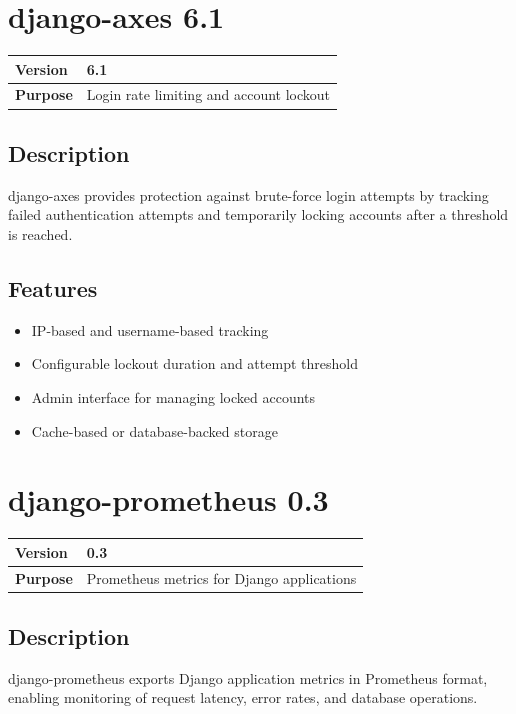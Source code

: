 \documentclass[12pt,a4paper]{report}
\begin{document}
\section{django-axes 6.1}

\begin{tabular}{|p{4cm}|p{10cm}|}
\hline
\textbf{Version} & 6.1 \\
\hline
\textbf{Purpose} & Login rate limiting and account lockout \\
\hline
\end{tabular}

\subsection{Description}

django-axes provides protection against brute-force login attempts by tracking failed authentication attempts and temporarily locking accounts after a threshold is reached.

\subsection{Features}

\begin{itemize}
    \item IP-based and username-based tracking
    \item Configurable lockout duration and attempt threshold
    \item Admin interface for managing locked accounts
    \item Cache-based or database-backed storage
\end{itemize}

\section{django-prometheus 0.3}

\begin{tabular}{|p{4cm}|p{10cm}|}
\hline
\textbf{Version} & 0.3 \\
\hline
\textbf{Purpose} & Prometheus metrics for Django applications \\
\hline
\end{tabular}

\subsection{Description}

django-prometheus exports Django application metrics in Prometheus format, enabling monitoring of request latency, error rates, and database operations.
\end{document}
